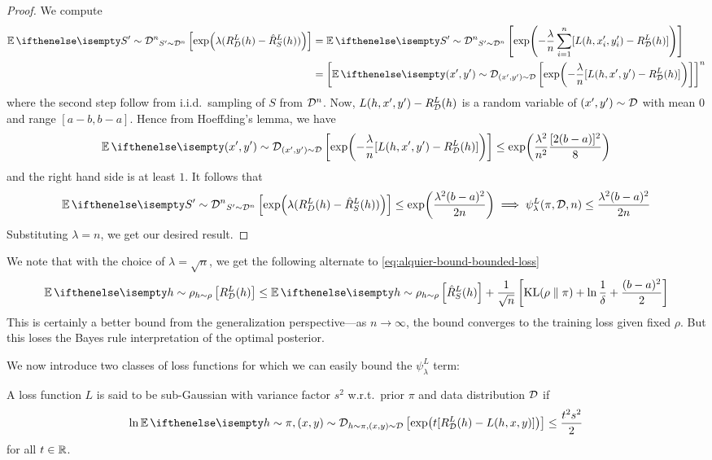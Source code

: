 \begin{proof}
  We compute
  \begin{equation}
    \begin{split}
      \Ev[S' \sim \CD^n]{\exp(\lambda (R_D^L(h) - \hat{R}_S^L(h)))}
      &= \Ev[S' \sim \CD^n]{\exp(-\frac{\lambda}{n} \sum_{i = 1}^n [L(h, x_i',
      y_i') - R_\CD^L(h)])} \\
      &= \left[\Ev[(x', y') \sim \CD]{\exp(-\frac{\lambda}{n} [L(h, x', y') -
      R_\CD^L(h)])}\right]^n
    \end{split}
  \end{equation}
  where the second step follow from i.i.d.\ sampling of $S$ from $\mathcal{D}^n$. Now,
  $L(h, x', y') - R_{\mathcal{D}}^L(h)$ is a random variable of $(x', y') \sim \mathcal{D}$ with
  mean $0$ and range $[a - b, b - a]$. Hence from Hoeffding's lemma, we have
  \begin{equation}
    \Ev[(x', y') \sim \CD]{\exp(-\frac{\lambda}{n} [L(h, x', y') - R_\CD^L(h)])}
    \leq \exp(\frac{\lambda^2}{n^2} \frac{[2 (b - a)]^2}{8})
  \end{equation}
  and the right hand side is at least $1$. It follows that
  \begin{equation}
    \Ev[S' \sim \CD^n]{\exp(\lambda (R_D^L(h) - \hat{R}_S^L(h)))} \leq
    \exp(\frac{\lambda^2 (b - a)^2}{2n}) \implies \psi_\lambda^L(\pi, \CD, n)
    \leq \frac{\lambda^2 (b - a)^2}{2 n}
  \end{equation}
  Substituting $\lambda = n$, we get our desired result.
\end{proof}

We note that with the choice of $\lambda = \sqrt{n}$, we get the following
alternate to \eqref{eq:alquier-bound-bounded-loss}
\begin{equation}
  \Ev[h \sim \rho]{R_\CD^L(h)} \leq \Ev[h \sim \rho]{\hat{R}_S^L(h)} +
  \frac{1}{\sqrt{n}}\left[\KL{\rho}{\pi} + \ln \frac{1}{\delta} + \frac{(b -
  a)^2}{2}\right]
\end{equation}
This is certainly a better bound from the generalization perspective---as $n \to
\infty$, the bound converges to the training loss given fixed $\rho$. But this
loses the Bayes rule interpretation of the optimal posterior.

We now introduce two classes of loss functions for which we can easily bound the
$\psi_\lambda^L$ term:

\begin{definition}
  A loss function $L$ is said to be sub-Gaussian with variance factor $s^2$
  w.r.t.\ prior $\pi$ and data distribution $\mathcal{D}$ if
  \begin{equation}
    \ln \Ev[h \sim \pi, (x, y) \sim \CD]{\exp(t [R_\CD^L(h) - L(h, x, y)])} \leq
    \frac{t^2 s^2}{2}
  \end{equation}
  for all $t \in \mathbb{R}$.
\end{definition}

